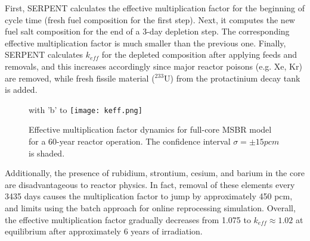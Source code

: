 First, SERPENT calculates the effective multiplication factor for the beginning 
of cycle time (fresh fuel composition for the first step). Next, it computes 
the new fuel salt composition for the end of a 3-day depletion step. The 
corresponding effective multiplication factor is much smaller than the previous 
one. Finally, SERPENT calculates $k_{eff}$ for the depleted composition after 
applying feeds and removals, and this increases accordingly since major reactor 
poisons (e.g. Xe, Kr) are removed, while fresh fissile material ($^{233}$U) 
from the protactinium decay tank is added.  \begin{figure}[ht!] %
        with 'b' to \centering
  \texttt{[image: keff.png]}
  \caption{Effective multiplication factor dynamics for full-core \gls{MSBR} 
  model for a 60-year reactor operation. The confidence interval 
  $\sigma=\pm15pcm$ is shaded.}
  \label{fig:keff}
\end{figure}
Additionally, the presence of rubidium, strontium, cesium, and barium in the 
core are disadvantageous to reactor physics. In fact, removal of these elements 
every 3435 days causes the multiplication factor to jump by approximately 450 
pcm, and limits using the batch approach for online reprocessing simulation. 
Overall, the effective multiplication factor gradually decreases from 1.075 to 
$k_{eff} \approx 1.02$ at equilibrium after approximately 6 years of 
irradiation. 

